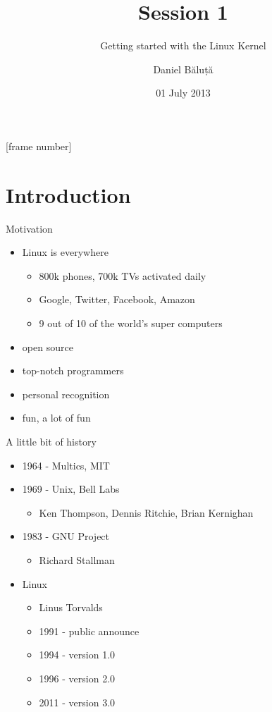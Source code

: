 \documentclass{workshop}
\title[Sesssion 1]{Session 1}
\subtitle{Getting started with the Linux Kernel}
\author{Daniel Băluță}
\date{01 July 2013}
\begin{document}
[frame number]

\frame{\titlepage}

\section{Introduction}

\begin{frame}{Motivation}
	\begin{itemize}
	\item Linux is everywhere
	\begin{itemize}
		\item 800k phones, 700k TVs activated daily
		\item Google, Twitter, Facebook, Amazon
		\item 9 out of 10 of the world's super computers
	\end{itemize}
	\item open source
	\item top-notch programmers
	\item personal recognition
	\item fun, a lot of fun
	\end{itemize}
\end{frame}

\begin{frame}{A little bit of history} 
	\begin{itemize}
	\item 1964 - Multics, MIT
	\item 1969 - Unix, Bell Labs
	\begin{itemize}
	\item Ken Thompson, Dennis Ritchie, Brian Kernighan
	\end{itemize}
	\item 1983 - GNU Project
	\begin{itemize}
	\item Richard Stallman
	\end{itemize}
	\item Linux 
	\begin{itemize}
	\item Linus Torvalds
	\item 1991 - public announce 
	\item 1994 - version 1.0
	\item 1996 - version 2.0
	\item 2011 - version 3.0
	\end{itemize}
	\end{itemize}
\end{frame}
\end{document}
